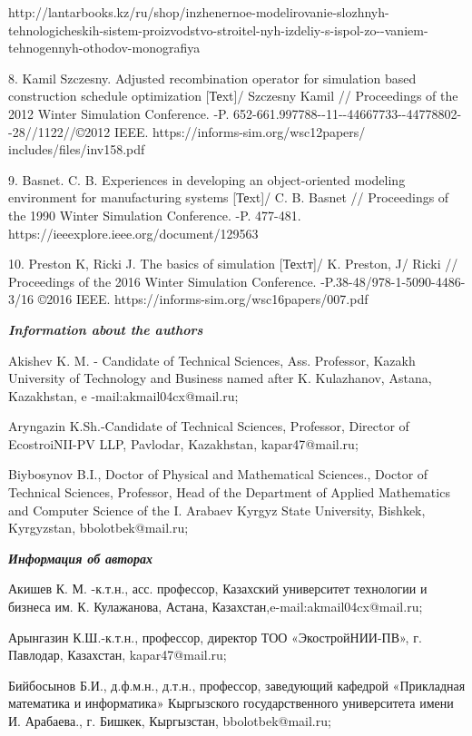 http://lantarbooks.kz/ru/shop/inzhenernoe-modelirovanie-slozhnyh-tehnologicheskih-sistem-proizvodstvo-stroitel-nyh-izdeliy-s-ispol-zo-\/-vaniem-tehnogennyh-othodov-monografiya

8. Kamil Szczesny. Adjusted recombination operator for simulation based
construction schedule optimization {[}Теxt{]}/ Szczesny Kamil //
Proceedings of the 2012 Winter Simulation Conference. -P.
652-661.997788-\/-11-\/-44667733-\/-44778802-\/-28//1122//©2012 IEEE.
https://informs-sim.org/wsc12papers/ includes/files/inv158.pdf

9. Basnet. C. B. Experiences in developing an object-oriented modeling
environment for manufacturing systems {[}Теxt{]}/ C. B. Basnet //
Proceedings of the 1990 Winter Simulation Conference. -P. 477-481.
https://ieeexplore.ieee.org/document/129563

10. Preston K, Ricki J. The basics of simulation {[}Теxtт{]}/ K.
Preston, J/ Ricki // Proceedings of the 2016 Winter Simulation
Conference. -P.38-48/978-1-5090-4486-3/16 ©2016 IEEE.
https://informs-sim.org/wsc16papers/007.pdf

\emph{{\bfseries Information about the authors}}

Akishev K. M. - Candidate of Technical Sciences, Ass. Professor, Kazakh
University of Technology and Business named after K. Kulazhanov, Astana,
Kazakhstan, e -mail:akmail04cx@mail.ru;

Aryngazin K.Sh.-Candidate of Technical Sciences, Professor, Director of
EcostroiNII-PV LLP, Pavlodar, Kazakhstan, kapar47@mail.ru;

Biybosynov B.I., Doctor of Physical and Mathematical Sciences., Doctor
of Technical Sciences, Professor, Head of the Department of Applied
Mathematics and Computer Science of the I. Arabaev Kyrgyz State
University, Bishkek, Kyrgyzstan, bbolotbek@mail.ru;

\emph{{\bfseries Информация об авторах}}

Акишев К. М. -к.т.н., асс. профессор, Казахский университет технологии и
бизнеса им. К. Кулажанова, Астана, Казахстан,e-mail:akmail04cx@mail.ru;

Арынгазин К.Ш.-к.т.н., профессор, директор ТОО «ЭкостройНИИ-ПВ», г.
Павлодар, Казахстан, kapar47@mail.ru;

Бийбосынов Б.И., д.ф.м.н., д.т.н., профессор, заведующий кафедрой
«Прикладная математика и информатика» Кыргызского государственного
университета имени И. Арабаева., г. Бишкек, Кыргызстан,
bbolotbek@mail.ru;